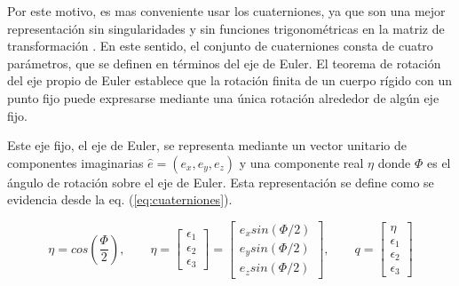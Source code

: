 Por este motivo, es mas conveniente usar los cuaterniones, ya que son una mejor representación sin singularidades y sin funciones trigonométricas en la matriz de transformación \cite{wertz1978spacecraft}. En este sentido, el conjunto de cuaterniones consta de cuatro parámetros, que se definen en términos del eje de Euler. El teorema de rotación del eje propio de Euler establece que la rotación finita de un cuerpo rígido con un punto fijo puede expresarse mediante una única rotación alrededor de algún eje fijo.

Este eje fijo, el eje de Euler, se representa mediante un vector unitario de componentes imaginarias $\hat{e} =(e_x,e_y,e_z)$ y una componente real $\eta$ donde $\Phi$ es el  ángulo de rotación sobre el eje de Euler. Esta representación se define como se evidencia desde la eq. (\ref{eq:cuaterniones}).

\begin{equation}
	\eta = cos\left(\frac{\Phi}{2}\right),
	\qquad
	\eta =\left[\begin{array}{c}
		\epsilon_1\\
		\epsilon_2\\
		 \epsilon_3
	\end{array}\right] =
	\left[\begin{array}{c}
		e_x sin\left(\Phi/2\right)\\
		e_y sin\left(\Phi/2\right)\\
		e_z sin\left(\Phi/2\right)
	\end{array}\right] ,
	\qquad
		q = \left[\begin{array}{c}
			\eta\\
		\epsilon_1\\
		\epsilon_2\\
		\epsilon_3
	\end{array}\right] 
	\label{eq:cuaterniones}
\end{equation}


